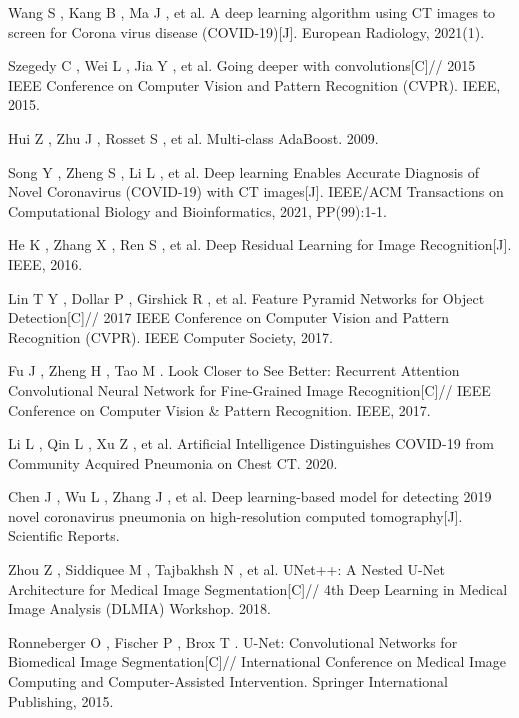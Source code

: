 \documentclass[journal,twoside,web]{ieeecolor}
\begin{document}
\begin{thebibliography}{00}
     Wang S ,  Kang B ,  Ma J , et al. A deep learning algorithm using CT images to screen for Corona virus disease (COVID-19)[J]. European Radiology, 2021(1).

     Szegedy C ,  Wei L ,  Jia Y , et al. Going deeper with convolutions[C]// 2015 IEEE Conference on Computer Vision and Pattern Recognition (CVPR). IEEE, 2015.
    
     Hui Z ,  Zhu J ,  Rosset S , et al. Multi-class AdaBoost.  2009.
    
     Song Y ,  Zheng S ,  Li L , et al. Deep learning Enables Accurate Diagnosis of Novel Coronavirus (COVID-19) with CT images[J]. IEEE/ACM Transactions on Computational Biology and Bioinformatics, 2021, PP(99):1-1.
    
     He K ,  Zhang X ,  Ren S , et al. Deep Residual Learning for Image Recognition[J]. IEEE, 2016.
    
     Lin T Y ,  Dollar P ,  Girshick R , et al. Feature Pyramid Networks for Object Detection[C]// 2017 IEEE Conference on Computer Vision and Pattern Recognition (CVPR). IEEE Computer Society, 2017.
    
     Fu J ,  Zheng H ,  Tao M . Look Closer to See Better: Recurrent Attention Convolutional Neural Network for Fine-Grained Image Recognition[C]// IEEE Conference on Computer Vision \& Pattern Recognition. IEEE, 2017.
    
     Li L ,  Qin L ,  Xu Z , et al. Artificial Intelligence Distinguishes COVID-19 from Community Acquired Pneumonia on Chest CT.  2020.
    
     Chen J ,  Wu L ,  Zhang J , et al. Deep learning-based model for detecting 2019 novel coronavirus pneumonia on high-resolution computed tomography[J]. Scientific Reports.
    
     Zhou Z ,  Siddiquee M ,  Tajbakhsh N , et al. UNet++: A Nested U-Net Architecture for Medical Image Segmentation[C]// 4th Deep Learning in Medical Image Analysis (DLMIA) Workshop. 2018.
    
     Ronneberger O ,  Fischer P ,  Brox T . U-Net: Convolutional Networks for Biomedical Image Segmentation[C]// International Conference on Medical Image Computing and Computer-Assisted Intervention. Springer International Publishing, 2015.
    

\end{thebibliography}
\end{document}
